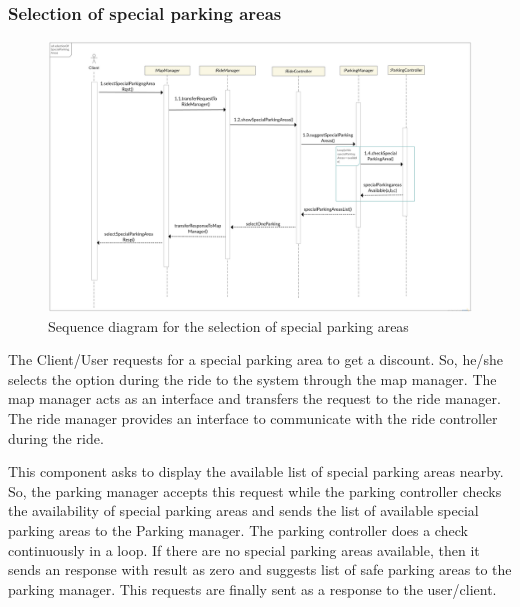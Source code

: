 \subsubsection{Selection of special parking areas}
\begin{figure}[t]
	\centering
	\includegraphics[width=\linewidth,keepaspectratio]{figures/special_parking_area_runtime.eps}
	\caption{Sequence diagram for the selection of special parking areas}
	\label{fig:special_parking_area_runtime}
\end{figure}

The Client/User requests for a special parking area to get a discount. So, he/she selects the option during the ride to the system through the map manager. The map manager
acts as an interface and transfers the request to the ride manager. The ride manager provides an interface to communicate with the ride controller during the ride. 

This component asks to display the available list of special parking areas nearby. So, the parking manager accepts this request while the parking controller checks the availability of special parking areas and sends the list of available special parking areas to the Parking manager. The parking controller does a check continuously in a loop. If there are no special parking areas available, then it sends an response with result as zero and suggests list of safe parking areas to the parking manager. This requests are finally sent as a response to the user/client.

